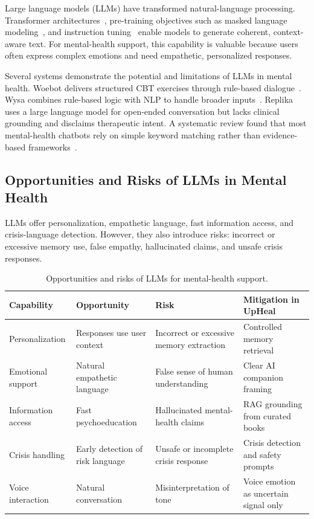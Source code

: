 \documentclass[12pt,a4paper,oneside,openany]{report}
\begin{document}
Large language models (LLMs) have transformed natural-language processing. Transformer architectures~\cite{vaswani2017attention}, pre-training objectives such as masked language modeling~\cite{devlin2019bert}, and instruction tuning~\cite{ouyang2022training} enable models to generate coherent, context-aware text. For mental-health support, this capability is valuable because users often express complex emotions and need empathetic, personalized responses.

Several systems demonstrate the potential and limitations of LLMs in mental health. Woebot delivers structured CBT exercises through rule-based dialogue~\cite{woebot2021}. Wysa combines rule-based logic with NLP to handle broader inputs~\cite{inkster2018empath}. Replika uses a large language model for open-ended conversation but lacks clinical grounding and disclaims therapeutic intent. A systematic review found that most mental-health chatbots rely on simple keyword matching rather than evidence-based frameworks~\cite{kumar2023mental}.

\subsection{Opportunities and Risks of LLMs in Mental Health}

LLMs offer personalization, empathetic language, fast information access, and crisis-language detection. However, they also introduce risks: incorrect or excessive memory use, false empathy, hallucinated claims, and unsafe crisis responses.

\begin{table}[H]
\centering\small
\caption{Opportunities and risks of LLMs for mental-health support.}
\label{tab:opprisk}
\begin{tabular}{@{}llll@{}}
\toprule
Capability & Opportunity & Risk & Mitigation in UpHeal \\
\midrule
Personalization & Responses use user context & Incorrect or excessive memory extraction & Controlled memory retrieval \\
Emotional support & Natural empathetic language & False sense of human understanding & Clear AI companion framing \\
Information access & Fast psychoeducation & Hallucinated mental-health claims & RAG grounding from curated books \\
Crisis handling & Early detection of risk language & Unsafe or incomplete crisis response & Crisis detection and safety prompts \\
Voice interaction & Natural conversation & Misinterpretation of tone & Voice emotion as uncertain signal only \\
\bottomrule
\end{tabular}
\end{table}
\end{document}
